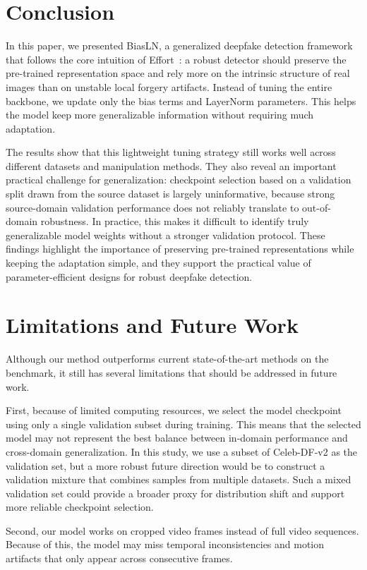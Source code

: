 \documentclass[fonts]{icst}
\begin{document}
\section{Conclusion}

In this paper, we presented BiasLN, a generalized deepfake detection framework that follows the core intuition of Effort~\cite{yan2025effort}: a robust detector should preserve the pre-trained representation space and rely more on the intrinsic structure of real images than on unstable local forgery artifacts.
Instead of tuning the entire backbone, we update only the bias terms and LayerNorm parameters. This helps the model keep more generalizable information without requiring much adaptation.

The results show that this lightweight tuning strategy still works well across different datasets and manipulation methods.
They also reveal an important practical challenge for generalization: checkpoint selection based on a validation split drawn from the source dataset is largely uninformative, because strong source-domain validation performance does not reliably translate to out-of-domain robustness.
In practice, this makes it difficult to identify truly generalizable model weights without a stronger validation protocol.
These findings highlight the importance of preserving pre-trained representations while keeping the adaptation simple, and they support the practical value of parameter-efficient designs for robust deepfake detection.


\section{Limitations and Future Work}
Although our method outperforms current state-of-the-art methods on the benchmark, it still has several limitations that should be addressed in future work.

First, because of limited computing resources, we select the model checkpoint using only a single validation subset during training.
This means that the selected model may not represent the best balance between in-domain performance and cross-domain generalization.
In this study, we use a subset of Celeb-DF-v2 as the validation set, but a more robust future direction would be to construct a validation mixture that combines samples from multiple datasets.
Such a mixed validation set could provide a broader proxy for distribution shift and support more reliable checkpoint selection.

Second, our model works on cropped video frames instead of full video sequences.
Because of this, the model may miss temporal inconsistencies and motion artifacts that only appear across consecutive frames.
\end{document}
